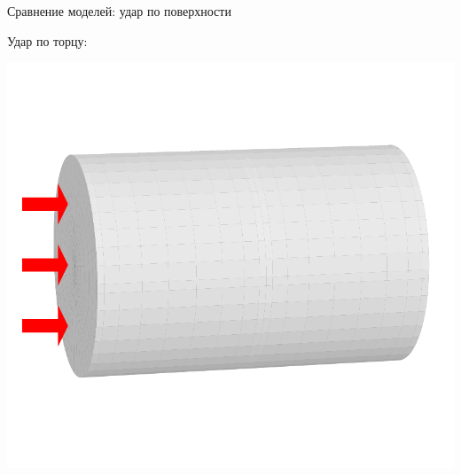 \documentclass[usenames,dvipsnames]{beamer}
\begin{document}
\begin{frame}{Сравнение моделей: удар по поверхности}
\vspace{2mm}
\begin{minipage}{\textwidth}
	\begin{minipage}[b]{0.65\textwidth}
		\flushleft
		Удар по торцу:
	\end{minipage}
	\hfill
	\begin{minipage}[b]{0.34\textwidth}
		\includegraphics[width=\linewidth]{figures/ImpactScheme}
	\end{minipage}
\end{minipage}
\end{frame}
\end{document}
